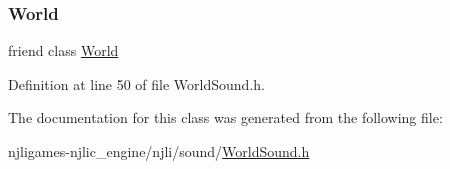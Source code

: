 \subsubsection{\texorpdfstring{World}{World}}
{\footnotesize\ttfamily friend class \mbox{\hyperlink{classnjli_1_1_world}{World}}\hspace{0.3cm}{\ttfamily [friend]}}



Definition at line 50 of file World\+Sound.\+h.



The documentation for this class was generated from the following file\+:\begin{DoxyCompactItemize}
\item 
njligames-\/njlic\+\_\+engine/njli/sound/\mbox{\hyperlink{_world_sound_8h}{World\+Sound.\+h}}\end{DoxyCompactItemize}

